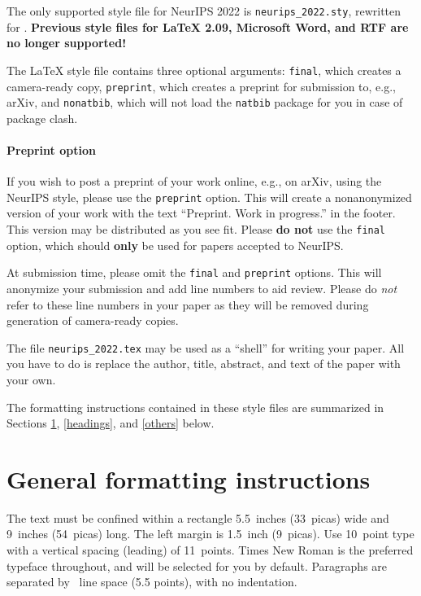 \documentclass{article}
\begin{document}
The only supported style file for NeurIPS 2022 is \verb+neurips_2022.sty+,
rewritten for \LaTeXe{}.  \textbf{Previous style files for \LaTeX{} 2.09,
  Microsoft Word, and RTF are no longer supported!}


The \LaTeX{} style file contains three optional arguments: \verb+final+, which
creates a camera-ready copy, \verb+preprint+, which creates a preprint for
submission to, e.g., arXiv, and \verb+nonatbib+, which will not load the
\verb+natbib+ package for you in case of package clash.


\paragraph{Preprint option}
If you wish to post a preprint of your work online, e.g., on arXiv, using the
NeurIPS style, please use the \verb+preprint+ option. This will create a
nonanonymized version of your work with the text ``Preprint. Work in progress.''
in the footer. This version may be distributed as you see fit. Please \textbf{do
  not} use the \verb+final+ option, which should \textbf{only} be used for
papers accepted to NeurIPS.


At submission time, please omit the \verb+final+ and \verb+preprint+
options. This will anonymize your submission and add line numbers to aid
review. Please do \emph{not} refer to these line numbers in your paper as they
will be removed during generation of camera-ready copies.


The file \verb+neurips_2022.tex+ may be used as a ``shell'' for writing your
paper. All you have to do is replace the author, title, abstract, and text of
the paper with your own.


The formatting instructions contained in these style files are summarized in
Sections \ref{gen_inst}, \ref{headings}, and \ref{others} below.


\section{General formatting instructions}
\label{gen_inst}


The text must be confined within a rectangle 5.5~inches (33~picas) wide and
9~inches (54~picas) long. The left margin is 1.5~inch (9~picas).  Use 10~point
type with a vertical spacing (leading) of 11~points.  Times New Roman is the
preferred typeface throughout, and will be selected for you by default.
Paragraphs are separated by ~line space (5.5 points), with no
indentation.
\end{document}
